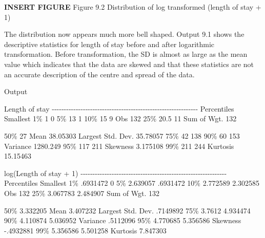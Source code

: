 \documentclass[
]{memoir}
\newenvironment{Shaded}{\begin{snugshade}}{\end{snugshade}}
\newcommand{\NormalTok}[1]{#1}
\begin{document}
\textbf{INSERT FIGURE}
Figure 9.2 Distribution of log transformed (length of stay + 1)

The distribution now appears much more bell shaped. Output 9.1 shows the descriptive statistics for length of stay before and after logarithmic transformation. Before transformation, the SD is almost as large as the mean value which indicates that the data are skewed and that these statistics are not an accurate description of the centre and spread of the data.

Output

\begin{Shaded}
\begin{Highlighting}[]
\NormalTok{                       Length of stay}
\NormalTok{{-}{-}{-}{-}{-}{-}{-}{-}{-}{-}{-}{-}{-}{-}{-}{-}{-}{-}{-}{-}{-}{-}{-}{-}{-}{-}{-}{-}{-}{-}{-}{-}{-}{-}{-}{-}{-}{-}{-}{-}{-}{-}{-}{-}{-}{-}{-}{-}{-}{-}{-}{-}{-}{-}{-}{-}{-}{-}{-}{-}{-}}
\NormalTok{      Percentiles      Smallest}
\NormalTok{ 1\%            1              0}
\NormalTok{ 5\%           13              1}
\NormalTok{10\%           15              9       Obs                 132}
\NormalTok{25\%         20.5             11       Sum of Wgt.         132}

\NormalTok{50\%           27                      Mean           38.05303}
\NormalTok{                        Largest       Std. Dev.      35.78057}
\NormalTok{75\%           42            138}
\NormalTok{90\%           60            153       Variance       1280.249}
\NormalTok{95\%          117            211       Skewness       3.175108}
\NormalTok{99\%          211            244       Kurtosis       15.15463}

\NormalTok{                   log(Length of stay + 1)}
\NormalTok{{-}{-}{-}{-}{-}{-}{-}{-}{-}{-}{-}{-}{-}{-}{-}{-}{-}{-}{-}{-}{-}{-}{-}{-}{-}{-}{-}{-}{-}{-}{-}{-}{-}{-}{-}{-}{-}{-}{-}{-}{-}{-}{-}{-}{-}{-}{-}{-}{-}{-}{-}{-}{-}{-}{-}{-}{-}{-}{-}{-}{-}}
\NormalTok{      Percentiles      Smallest}
\NormalTok{ 1\%     .6931472              0}
\NormalTok{ 5\%     2.639057       .6931472}
\NormalTok{10\%     2.772589       2.302585       Obs                 132}
\NormalTok{25\%     3.067783       2.484907       Sum of Wgt.         132}

\NormalTok{50\%     3.332205                      Mean           3.407232}
\NormalTok{                        Largest       Std. Dev.      .7149892}
\NormalTok{75\%       3.7612       4.934474}
\NormalTok{90\%     4.110874       5.036952       Variance       .5112096}
\NormalTok{95\%     4.770685       5.356586       Skewness      {-}.4932881}
\NormalTok{99\%     5.356586       5.501258       Kurtosis       7.847303}
\end{Highlighting}
\end{Shaded}
\end{document}
